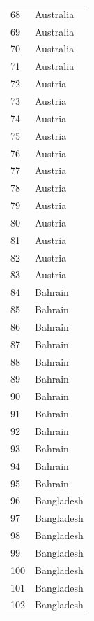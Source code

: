 \documentclass[
  letterpaper,
  DIV=11,
  numbers=noendperiod]{scrreprt}
\begin{document}
\begin{tabular}{ll}
68   &                 Australia \\
69   &                 Australia \\
70   &                 Australia \\
71   &                 Australia \\
72   &                   Austria \\
73   &                   Austria \\
74   &                   Austria \\
75   &                   Austria \\
76   &                   Austria \\
77   &                   Austria \\
78   &                   Austria \\
79   &                   Austria \\
80   &                   Austria \\
81   &                   Austria \\
82   &                   Austria \\
83   &                   Austria \\
84   &                   Bahrain \\
85   &                   Bahrain \\
86   &                   Bahrain \\
87   &                   Bahrain \\
88   &                   Bahrain \\
89   &                   Bahrain \\
90   &                   Bahrain \\
91   &                   Bahrain \\
92   &                   Bahrain \\
93   &                   Bahrain \\
94   &                   Bahrain \\
95   &                   Bahrain \\
96   &                Bangladesh \\
97   &                Bangladesh \\
98   &                Bangladesh \\
99   &                Bangladesh \\
100  &                Bangladesh \\
101  &                Bangladesh \\
102  &                Bangladesh \\

\end{tabular}
\end{document}
